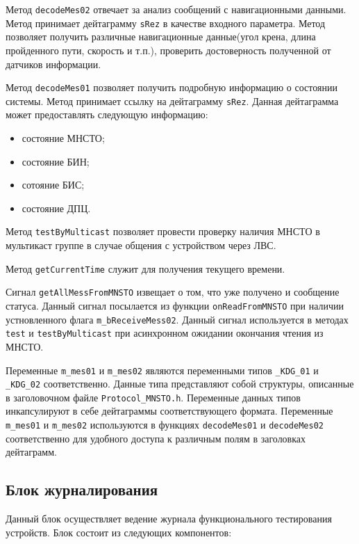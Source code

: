 \begin{enum}
	\item Метод \texttt{decodeMes02} отвечает за анализ сообщений с навигационными данными. Метод принимает
		дейтаграмму \texttt{sRez} в качестве входного параметра. Метод позволяет получить
		различные навигационные данные(угол крена, длина пройденного пути, скорость и т.п.),
		проверить достоверность полученной от датчиков информации.

	\item Метод \texttt{decodeMes01} позволяет получить подробную информацию о состоянии системы. Метод принимает
		ссылку на дейтаграмму \texttt{sRez}. Данная
		дейтаграмма может предоставлять следующую информацию:
		\begin{itemize}
				\item состояние МНСТО;
				\item состояние БИН;
				\item сотояние БИС;
				\item состояние ДПЦ.
		\end{itemize}

	\item Метод \texttt{testByMulticast} позволяет провести проверку наличия МНСТО в мультикаст группе в случае
		общения с устройством через ЛВС.

	\item Метод \texttt{getCurrentTime} служит для получения текущего времени.

	\item Сигнал \texttt{getAllMessFromMNSTO} извещает о том, что уже получено и сообщение статуса. Данный сигнал
		посылается из функции \texttt{onReadFromMNSTO} при наличии
		устновленного флага
		\texttt{m\_bReceiveMess02}. Данный сигнал используется в методах
		\texttt{test} и \texttt{testByMulticast} при асинхронном ожидании окончания чтения из МНСТО.

	\item Переменные \texttt{m\_mes01} и \texttt{m\_mes02} являются переменными типов \texttt{\_KDG\_01} и
		\texttt{\_KDG\_02} соответственно. Данные типа представляют собой структуры, описанные в заголовочном
		файле \texttt{Protocol\_MNSTO.h}. Переменные данных типов инкапсулируют в себе дейтаграммы
		соответствующего формата. Переменные \texttt{m\_mes01} и \texttt{m\_mes02} используются в функциях
		\texttt{decodeMes01} и \texttt{decodeMes02} соответственно для удобного доступа к различным полям в
		заголовках дейтаграмм.
\end{enum}

\subsection{Блок журналирования}
Данный блок осуществляет ведение журнала функционального тестирования устройств. Блок состоит из следующих компонентов:

